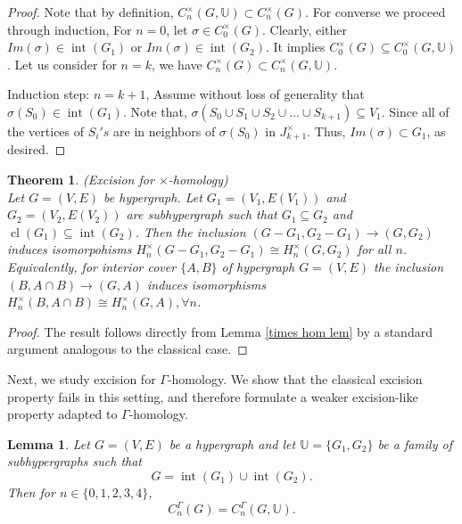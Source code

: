 \documentclass[11pt]{amsart}
\newtheorem{thm}{Theorem}[section]
\newtheorem{lem}[subsection]{Lemma}
\newcommand{\cl}{\operatorname{cl}}
\renewcommand{\int}{\operatorname{int}}
\begin{document}
\begin{proof} Note that by definition, $C_n^\times(G,\mathbb{U}) \subset C_n^\times(G)$. For converse we proceed through induction,
For $n=0$, let $\sigma \in  C_0^\times(G)$. Clearly, either $Im(\sigma) \in \int(G_1)$ or $Im(\sigma) \in \int(G_2)$. It implies $C_0^\times(G)\subseteq C_0^\times(G,\mathbb{U})$. Let us consider for $n=k$, we have $C_n^\times(G)\subset C_n^\times(G,\mathbb{U})$.

Induction step: $n=k+1$, Assume without loss of generality that $\sigma(S_0) \in \int(G_1).$ Note that,  $\sigma(S_0 \cup S_1 \cup S_2 \cup\ldots \cup S_{k+1}) \subseteq V_1.$ Since all of the vertices of $S_i's$ are in neighbors of $\sigma(S_0)$ in $J^\times_{k+1}$. Thus, $Im(\sigma)\subset G_1$, as desired. 
\end{proof}

\begin{thm}
(Excision for $\times$-homology)\\
Let $G=(V,E)$ be hypergraph. Let $G_1=(V_1,E(V_1))$ and $G_2=(V_2,E(V_2))$ are subhypergraph such that $G_1\subseteq G_2$ and $\cl(G_1)\subseteq \int(G_2)$. Then the inclusion $(G-G_1,G_2-G_1)\rightarrow (G,G_2)$ induces isomorpohisms $H_{n}^{\times}(G-G_1,G_2-G_1)\cong H_{n}^{\times}(G,G_2)$ for all $n$. Equivalently, for interior cover $\{A,B\}$ of hypergraph $G=(V,E)$ the inclusion $(B,A\cap B)\rightarrow (G,A)$ induces isomorphisms $H_{n}^{\times}(B,A\cap B)\cong H_{n}^{\times}(G,A), \forall n$.
\end{thm}
		\begin{proof}
The result follows directly from Lemma \ref{times hom lem} by a standard argument analogous to the classical case.
\end{proof}
\medskip

Next, we study excision for $\Gamma$-homology. We show that the classical excision property fails in this setting, and therefore formulate a weaker excision-like property adapted to $\Gamma$-homology.
\begin{lem}\label{lem:Gamma-localization}
Let $G=(V,E)$ be a hypergraph and let $\mathbb{U}=\{G_1,G_2\}$ be a family of subhypergraphs such that
\[
G = \int(G_1) \cup \int(G_2).
\]
Then for $n \in \{0,1,2,3,4\}$,
\[
C_n^\Gamma(G) = C_n^\Gamma(G,\mathbb{U}).
\]
\end{lem}
\end{document}
